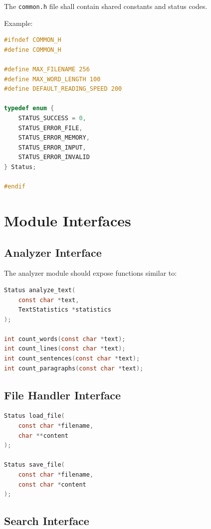 \documentclass[12pt,a4paper]{article}
\begin{document}
The \texttt{common.h} file shall contain shared constants and status
codes.

Example:

\begin{lstlisting}[language=C]
#ifndef COMMON_H
#define COMMON_H

#define MAX_FILENAME 256
#define MAX_WORD_LENGTH 100
#define DEFAULT_READING_SPEED 200

typedef enum {
    STATUS_SUCCESS = 0,
    STATUS_ERROR_FILE,
    STATUS_ERROR_MEMORY,
    STATUS_ERROR_INPUT,
    STATUS_ERROR_INVALID
} Status;

#endif
\end{lstlisting}


\section{Module Interfaces}

\subsection{Analyzer Interface}

The analyzer module should expose functions similar to:

\begin{lstlisting}[language=C]
Status analyze_text(
    const char *text,
    TextStatistics *statistics
);

int count_words(const char *text);
int count_lines(const char *text);
int count_sentences(const char *text);
int count_paragraphs(const char *text);
\end{lstlisting}

\subsection{File Handler Interface}

\begin{lstlisting}[language=C]
Status load_file(
    const char *filename,
    char **content
);

Status save_file(
    const char *filename,
    const char *content
);
\end{lstlisting}

\subsection{Search Interface}
\end{document}
